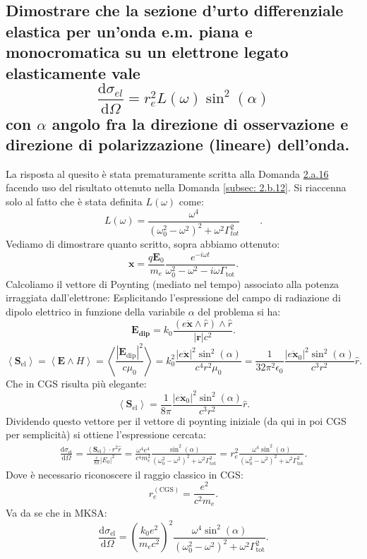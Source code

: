 \subsection[\hspace{2mm} Sezione d'urto differenziale elastica per onda monocromatica su elettrone legato elasticamente]{Dimostrare che la sezione d’urto differenziale elastica per un’onda e.m. piana e monocromatica su un elettrone legato elasticamente vale 
\[
	\frac{\mbox{d} \sigma_{el}}{\mbox{d} \Omega} = r_e^2 L\left( \omega \right) \sin^2\left( \alpha  \right)    
\]
con $\alpha$ angolo fra la direzione di osservazione e direzione di polarizzazione (lineare) dell'onda.} \label{subsec: 2.b.13}
La risposta al quesito è stata prematuramente scritta alla Domanda \hyperref[subsec: 2.a.16]{2.a.16} facendo uso del risultato ottenuto nella Domanda \ref{subsec: 2.b.12}.
Si riaccenna solo al fatto che è stata definita $L\left( \omega  \right)$ come:
\[ 
	L \left( \omega \right) = \frac{\omega^4}{\left( \omega_{0}^2 - \omega^2 \right)^2 + \omega^2 \Gamma_{tot}^2 } \quad \quad 
.\] 
Vediamo di dimostrare quanto scritto, sopra abbiamo ottenuto:
\[
\boldsymbol{x} = \frac{q \boldsymbol{E}_0}{m_e} \frac{e^{-i \omega t}}{\omega _0^2 - \omega ^2 - i \omega \Gamma_{\text{tot}}} 
.\] 
Calcoliamo il vettore di Poynting (mediato nel tempo) associato alla potenza irraggiata dall'elettrone:
Esplicitando l'espressione del campo di radiazione di dipolo elettrico in funzione della variabile $\alpha$ del problema si ha:
\[
	\boldsymbol{E_{\text{dip}}} =k_0 \frac{\left( e\ddot{\boldsymbol{x}} \wedge \hat{r}\right) \wedge \hat{r}}{\left| \boldsymbol{r} \right| c^2} 
.\] 
\[
	\left<\boldsymbol{S}_{\text{el}} \right> = \left< \boldsymbol{E} \wedge H\right> = \left<\frac{\left| \boldsymbol{E}_{\text{dip}} \right|^2}{c \mu_0}  \right> = 
	k_0^2\frac{\left| e \ddot{\boldsymbol{x}}  \right|^2 \sin^2\left( \alpha  \right) }{c^4 r^2 \mu_0 } =
	\frac{1}{32 \pi^2 \epsilon_0} \frac{ \left| e \ddot{\boldsymbol{x}}_0 \right|^2 \sin^2\left( \alpha \right) }{c^3 r^2} \hat{r}
.\] 
Che in CGS risulta più elegante:
\[
\left<\boldsymbol{S}_{\text{el}} \right> = \frac{1}{8 \pi} \frac{ \left| e \ddot{\boldsymbol{x}}_0 \right|^2 \sin^2\left( \alpha \right) }{c^3 r^2} \hat{r} 
.\] 
Dividendo questo vettore per il vettore di poynting iniziale (da qui in poi CGS per semplicità) si ottiene l'espressione cercata:
\begin{align*}
\frac{\mbox{d} \sigma_{\text{el}}}{\mbox{d} \Omega} = \frac{\left< \boldsymbol{S}_{\text{el}} \right> \cdot r^2 \hat{r}}{\frac{c}{8 \pi}\left| E_0 \right|^2 } = 
\frac{ \omega^{4} e^{4}}{c^{4}m_e^2} \frac{\sin^2\left( \alpha  \right) }{\left( \omega _0^2 - \omega ^2 \right)^2 + \omega ^2 \Gamma_{\text{tot}}^2} =
r_e^2 \frac{\omega ^{4}\sin^2\left( \alpha \right)}{\left( \omega _0^2 - \omega ^2 \right)^2 + \omega ^2 \Gamma_{\text{tot}}^2}
.\end{align*}
Dove è necessario riconoscere il raggio classico in CGS:
\[
	r_e^{\left( \text{CGS} \right) } = \frac{e^2}{c^2m_e}
.\] 
Va da se che in MKSA:
\[
	\frac{\mbox{d} \sigma_{\text{el}}}{\mbox{d} \Omega} = \left( \frac{k_0 e^2}{m_e c^2} \right) ^2 \frac{\omega ^{4}\sin^2\left( \alpha \right)}{\left( \omega _0^2 - \omega ^2 \right)^2 + \omega ^2 \Gamma_{\text{tot}}^2}
.\] 

